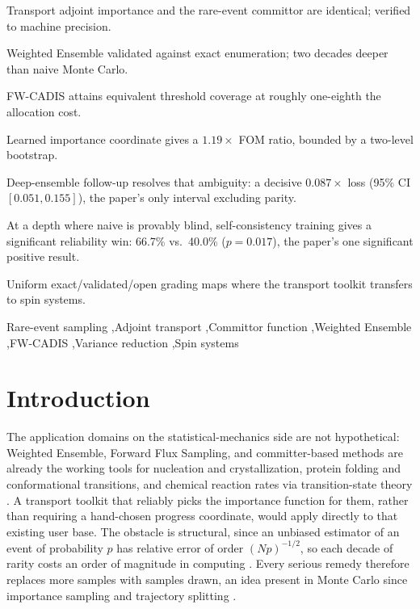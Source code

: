 \documentclass[a4paper,fleqn]{cas-sc}
\begin{document}
\begin{highlights}
\item Transport adjoint importance and the rare-event committor are identical; verified to machine precision.
\item Weighted Ensemble validated against exact enumeration; two decades deeper than naive Monte Carlo.
\item FW-CADIS attains equivalent threshold coverage at roughly one-eighth the allocation cost.
\item Learned importance coordinate gives a $1.19\times$ FOM ratio, bounded by a two-level bootstrap.
\item Deep-ensemble follow-up resolves that ambiguity: a decisive $0.087\times$ loss (95\% CI $[0.051,0.155]$), the paper's only interval excluding parity.
\item At a depth where naive is provably blind, self-consistency training gives a significant reliability win: 66.7\% vs.\ 40.0\% ($p=0.017$), the paper's one significant positive result.
\item Uniform exact/validated/open grading maps where the transport toolkit transfers to spin systems.
\end{highlights}

\begin{keywords}
Rare-event sampling \sep Adjoint transport \sep Committor function \sep Weighted Ensemble \sep FW-CADIS \sep Variance reduction \sep Spin systems
\end{keywords}

\maketitle

\section{Introduction}\label{sec:intro}

The application domains on the statistical-mechanics side are not hypothetical: Weighted Ensemble, Forward Flux Sampling, and committer-based
methods are already the working tools for nucleation and crystallization, protein folding
and conformational transitions, and chemical reaction rates via transition-state theory
\cite{allen2009, zuckerman2017, e2006}. A transport toolkit that reliably picks the
importance function for them, rather than requiring a hand-chosen progress coordinate,
would apply directly to that existing user base. The obstacle is structural, since an unbiased estimator of an
event of probability $p$ has relative error of order $(Np)^{-1/2}$, so each decade of
rarity costs an order of magnitude in computing \cite{allen2009, touchette2009}. Every
serious remedy therefore replaces more samples with samples drawn, an idea present in Monte Carlo since importance sampling and trajectory splitting \cite{kahn1951, kahn1953}.
\end{document}
